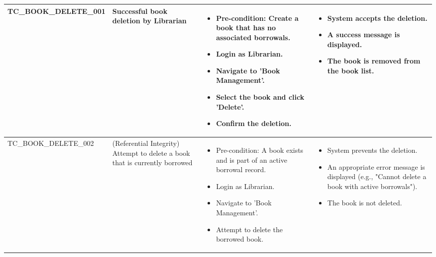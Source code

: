 \documentclass[10pt, a4paper]{report}
\begin{document}
\begin{longtable}{|>{\raggedright\arraybackslash}p{4.5cm}|>{\raggedright\arraybackslash}p{4cm}|>{\raggedright\arraybackslash}p{4.5cm}|>{\raggedright\arraybackslash}p{4cm}|}
TC\_BOOK\_DELETE\_001 & Successful book deletion by Librarian & 
    \begin{itemize}[noitemsep, topsep=0pt, partopsep=0pt, leftmargin=*]
        \item Pre-condition: Create a book that has no associated borrowals.
        \item Login as Librarian.
        \item Navigate to 'Book Management'.
        \item Select the book and click 'Delete'.
        \item Confirm the deletion.
    \end{itemize} & 
    \begin{itemize}[noitemsep, topsep=0pt, partopsep=0pt, leftmargin=*]
        \item System accepts the deletion.
        \item A success message is displayed.
        \item The book is removed from the book list.
    \end{itemize} \\ \hline
TC\_BOOK\_DELETE\_002 & (Referential Integrity) Attempt to delete a book that is currently borrowed & 
    \begin{itemize}[noitemsep, topsep=0pt, partopsep=0pt, leftmargin=*]
        \item Pre-condition: A book exists and is part of an active borrowal record.
        \item Login as Librarian.
        \item Navigate to 'Book Management'.
        \item Attempt to delete the borrowed book.
    \end{itemize} & 
    \begin{itemize}[noitemsep, topsep=0pt, partopsep=0pt, leftmargin=*]
        \item System prevents the deletion.
        \item An appropriate error message is displayed (e.g., "Cannot delete a book with active borrowals").
        \item The book is not deleted.
    \end{itemize} \\ \hline


\end{longtable}
\end{document}
